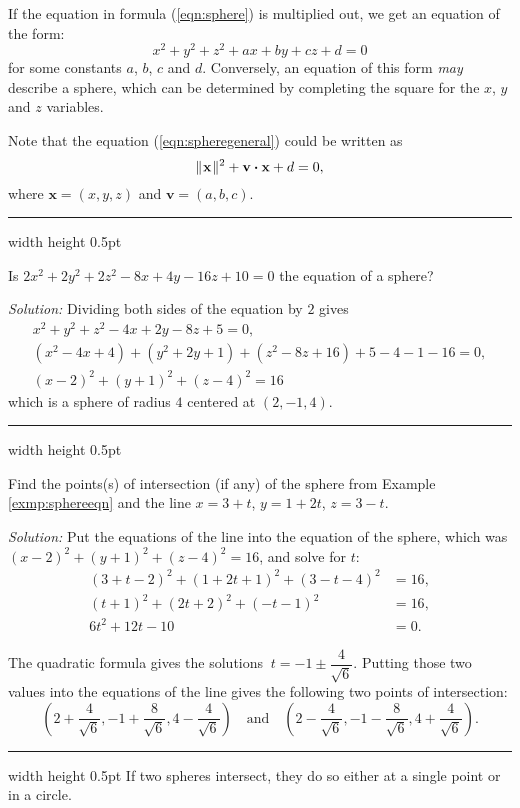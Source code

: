 If the equation in formula (\ref{eqn:sphere}) is multiplied out, we get an equation of the form:
\begin{equation}\label{eqn:spheregeneral}
 x^2 + y^2 + z^2 + ax + by + cz + d = 0
\end{equation}
for some constants $a$, $b$, $c$ and $d$. Conversely, an equation of this form
\emph{may} describe a sphere, which can be determined by completing the
square for the $x$, $y$ and $z$ variables.

Note that the equation (\ref{eqn:spheregeneral}) could be written as 
\[\lVert\mspace{1mu}\textbf{x}\mspace{1mu}\rVert^2+\textbf{v} \bm{\cdot} \textbf{x}+d=0,
\]
where $\textbf{x}=(x,y,z)$ and $\textbf{v}=(a,b,c)$.

\smallskip
\hrule width \textwidth height 0.5pt
\begin{exmp}\label{exmp:sphereeqn}
 Is $2x^2 + 2y^2 + 2z^2 - 8x + 4y - 16z + 10 = 0$ the equation of a sphere?\smallskip
 \par\noindent\emph{Solution:} Dividing both sides of the equation by $2$ gives
 \begin{gather*}
  x^2 + y^2 + z^2 - 4x + 2y - 8z + 5 = 0,\\
  (x^2 - 4x + 4) + (y^2 + 2y + 1) + (z^2 - 8z + 16) + 5 - 4 - 1 - 16 = 0,\\
  (x - 2)^2 + (y + 1)^2 + (z - 4)^2 = 16
 \end{gather*}
 which is a sphere of radius $4$ centered at $(2,-1,4)$.
\end{exmp}
\hrule width \textwidth height 0.5pt
\begin{exmp}\label{exmp:sphereline}
 Find the points(s) of intersection (if any) of the sphere from Example \ref{exmp:sphereeqn} and the line
 $x = 3 + t$, $y = 1 + 2t$, $z = 3 - t$.
 \smallskip
 \par\noindent\emph{Solution:} Put the equations of the line into the equation of the sphere, which was
 $(x - 2)^2 + (y + 1)^2 + (z - 4)^2 = 16$, and solve for $t$:
 \begin{align*}
  (3 + t - 2)^2 + (1 + 2t + 1)^2 + (3 - t - 4)^2 &= 16,\\
  (t + 1)^2 + (2t + 2)^2 + (-t - 1)^2 &= 16,\\
  6t^2 + 12t -10 &= 0.
 \end{align*}
 \par\noindent The quadratic formula gives the solutions $~t = -1 \pm \dfrac{4}{\sqrt{6}}$. Putting those
 two values into the equations of the line gives the following two points of intersection:
 \begin{displaymath}
  \left( 2 + \frac{4}{\sqrt{6}}, -1 + \frac{8}{\sqrt{6}}, 4 - \frac{4}{\sqrt{6}} \right) \quad \text{and} \quad
  \left( 2 - \frac{4}{\sqrt{6}}, -1 - \frac{8}{\sqrt{6}}, 4 + \frac{4}{\sqrt{6}} \right).
 \end{displaymath}
\end{exmp}
\hrule width \textwidth height 0.5pt
\pagebreak[3]
If two spheres intersect, they do so either at a single point or in a circle.

